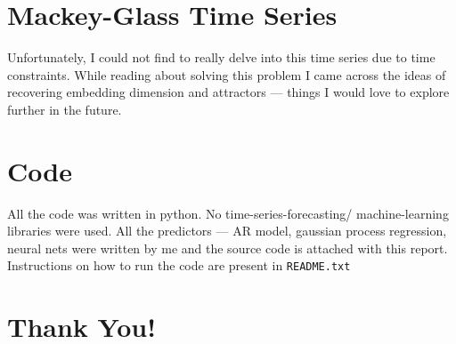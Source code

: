 \documentclass[11pt]{report}
\begin{document}
\section*{Mackey-Glass Time Series}
Unfortunately, I could not find to really delve into this time series due to time constraints. While reading about solving this problem I came across the ideas of recovering embedding dimension and attractors --- things I would love to explore further in the future.
\section*{Code}
All the code was written in python. No time-series-forecasting/ machine-learning libraries were used. All the predictors --- AR model, gaussian process regression, neural nets were written by me and the source code is attached with this report. Instructions on how to run the code are present in \texttt{README.txt}
\section*{Thank You!}
\end{document}
